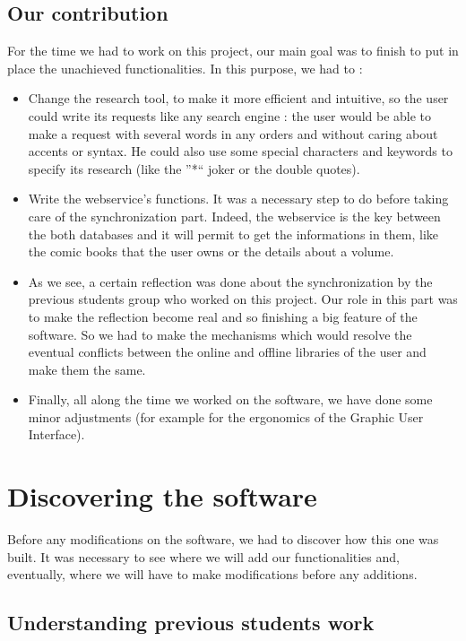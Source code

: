 \documentclass[11pt]{report} %
\begin{document}
\section{Our contribution}
For the time we had to work on this project, our main goal was to finish to put in place the unachieved functionalities. In this purpose, we had to :
\begin{itemize}
\item Change the research tool, to make it more efficient and intuitive, so the user could write its requests like any search engine : the user would be able to make a request with several words in any orders and without caring about accents or syntax. He could also use some special characters and keywords to specify its research (like the ''*`` joker or the double quotes).
\item Write the webservice's functions. It was a necessary step to do before taking care of the synchronization part. Indeed, the webservice is the key between the both databases and it will permit to get the informations in them, like the comic books that the user owns or the details about a volume.
\item As we see, a certain reflection was done about the synchronization by the previous students group who worked on this project. Our role in this part was to make the reflection become real and so finishing a big feature of the software. So we had to make the mechanisms which would resolve the eventual conflicts between the online and offline libraries of the user and make them the same.
\item Finally, all along the time we worked on the software, we have done some minor adjustments (for example for the ergonomics of the Graphic User Interface).

\end{itemize}


%
% 

\chapter{Discovering the software}
Before any modifications on the software, we had to discover how this one was built. It was necessary to see where we will add our functionalities and, eventually, where we will have to make modifications before any additions.

\section{Understanding previous students work}
%
%
%
\end{document}
